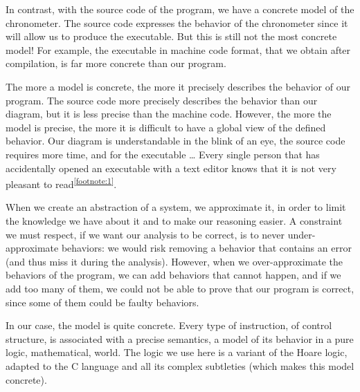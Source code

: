 In contrast, with the source code of the program, we have a concrete
model of the chronometer. The source code expresses the behavior of the
chronometer since it will allow us to produce the executable. But this
is still not the most concrete model! For example, the executable in
machine code format, that we obtain after compilation, is far more
concrete than our program.



The more a model is concrete, the more it precisely describes the
behavior of our program. The source code more precisely describes the
behavior than our diagram, but it is less precise than the machine code.
However, the more the model is precise, the more it is difficult to have
a global view of the defined behavior. Our diagram is understandable in
the blink of an eye, the source code requires more time, and for the
executable \ldots{} Every single person that has accidentally opened an
executable with a text editor knows that it is not very
pleasant to read\textsuperscript{\ref{footnote:1}}.



When we create an abstraction of a system, we approximate it, in order
to limit the knowledge we have about it and to make our reasoning easier. A
constraint we must respect, if we want our analysis to be correct, is to
never under-approximate behaviors: we would risk removing a behavior
that contains an error (and thus miss it during the analysis). However,
when we over-approximate the behaviors of the program, we can add
behaviors that cannot happen, and if we add too many of them, we could
not be able to prove that our program is correct, since some of them could be
faulty behaviors.



In our case, the model is quite concrete. Every type of instruction, of
control structure, is associated with a precise semantics, a model of its
behavior in a pure logic, mathematical, world. The logic we use here is
a variant of the Hoare logic, adapted to the C language and all its
complex subtleties (which makes this model concrete).






